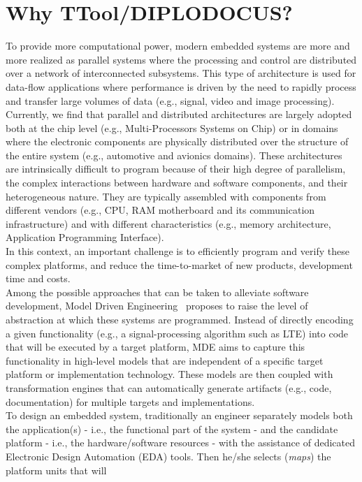 \documentclass{llncs}
\begin{document}
\newpage
\section{Why TTool/DIPLODOCUS?}
\label{sec:Introduction}
%
To provide more computational power, modern embedded systems are more and more realized as parallel systems where the
processing and control are distributed over a network of interconnected subsystems. This type of architecture is
used for data-flow applications where performance is driven by the need to rapidly process and transfer large volumes
of data (e.g., signal, video and image processing). Currently, we find that parallel and distributed architectures are
largely adopted both at the chip level (e.g., Multi-Processors Systems on Chip) or in domains where the electronic
components are physically distributed over the structure of the entire system (e.g., automotive and avionics domains).
These architectures are intrinsically difficult to program because of their high degree of parallelism, the complex
interactions between hardware and software components, and their heterogeneous nature. They are typically
assembled with components from different vendors (e.g., CPU, RAM motherboard and its communication infrastructure) and
with different characteristics (e.g., memory architecture, Application Programming Interface).\\
%
In this context, an important challenge is to efficiently program and verify these complex platforms, and reduce the
time-to-market of new products, development time and costs.\\
%
Among the possible approaches that can be taken to alleviate software development, Model Driven
Engineering~\cite{Schmidt} proposes to raise the level of abstraction at which these systems are programmed. Instead of
directly encoding a given functionality (e.g., a signal-processing algorithm such as LTE) into code that will be
executed by a target platform, MDE aims to capture this functionality in high-level models that are independent of a
specific target platform or implementation technology. These models are then coupled with transformation engines that
can automatically generate artifacts (e.g., code, documentation) for multiple targets and implementations.\\
%
To design an embedded system, traditionally an engineer separately models both the application(s) - i.e., the functional
part of the system - and the candidate platform - i.e., the hardware/software resources - with the assistance of
dedicated Electronic Design Automation (EDA) tools. Then he/she selects (\textit{maps}) the platform units that will
\end{document}
